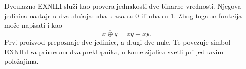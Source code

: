 
Dvoulazno EXNILI služi kao provera jednakosti dve binarne vrednosti. Njegova jedinica nastaje u dva slučaja: oba ulaza su 0 ili oba su 1. Zbog toga se funkcija može napisati i kao
\[
\overline{x\oplus y}=xy+\bar{x}\bar{y}.
\]
Prvi proizvod prepoznaje dve jedinice, a drugi dve nule. To povezuje simbol EXNILI sa primerom dva preklopnika, u kome sijalica svetli pri jednakim položajima.
